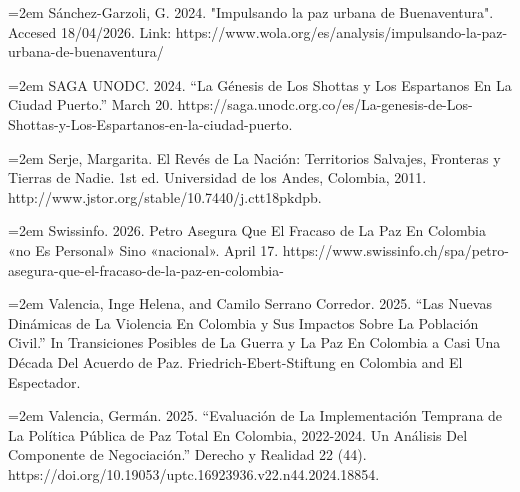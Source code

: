 \documentclass[11pt]{article}
\begin{document}
\noindent
\hangindent=2em
Sánchez-Garzoli, G. 2024. "Impulsando la paz urbana de Buenaventura". Accesed 18/04/2026. Link: https://www.wola.org/es/analysis/impulsando-la-paz-urbana-de-buenaventura/

\noindent
\hangindent=2em
SAGA UNODC. 2024. “La Génesis de Los Shottas y Los Espartanos En La Ciudad Puerto.” March 20. https://saga.unodc.org.co/es/La-genesis-de-Los-Shottas-y-Los-Espartanos-en-la-ciudad-puerto.

\noindent
\hangindent=2em
Serje, Margarita. El Revés de La Nación: Territorios Salvajes, Fronteras y Tierras de Nadie. 1st ed. Universidad de los Andes, Colombia, 2011. http://www.jstor.org/stable/10.7440/j.ctt18pkdpb.

\noindent
\hangindent=2em
Swissinfo. 2026. Petro Asegura Que El Fracaso de La Paz En Colombia «no Es Personal» Sino «nacional». April 17. https://www.swissinfo.ch/spa/petro-asegura-que-el-fracaso-de-la-paz-en-colombia-%

\noindent
\hangindent=2em
Valencia, Inge Helena, and Camilo Serrano Corredor. 2025. “Las Nuevas Dinámicas de La Violencia En Colombia y Sus Impactos Sobre La Población Civil.” In Transiciones Posibles de La Guerra y La Paz En Colombia a Casi Una Década Del Acuerdo de Paz. Friedrich-Ebert-Stiftung en Colombia and El Espectador.

\noindent
\hangindent=2em
Valencia, Germán. 2025. “Evaluación de La Implementación Temprana de La Política Pública de Paz Total En Colombia, 2022-2024. Un Análisis Del Componente de Negociación.” Derecho y Realidad 22 (44). https://doi.org/10.19053/uptc.16923936.v22.n44.2024.18854.
\end{document}
